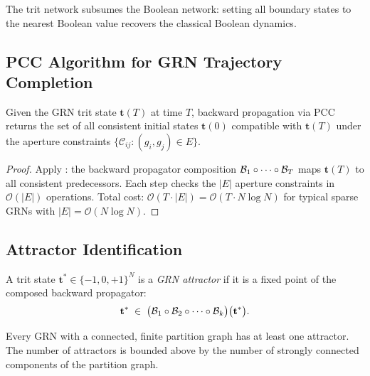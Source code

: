 The trit network subsumes the Boolean network: setting all boundary states
to the nearest Boolean value recovers the classical Boolean dynamics.

\subsection{PCC Algorithm for GRN Trajectory Completion}

\begin{theorem}
\label{thm:ch05-grn-back}
Given the GRN trit state $\mathbf{t}(T)$ at time $T$, backward propagation
via PCC returns the set of all consistent initial states $\mathbf{t}(0)$
compatible with $\mathbf{t}(T)$ under the aperture constraints $\{
\mathcal{C}_{ij} : (g_i, g_j) \in E\}$.
\end{theorem}

\begin{proof}
Apply : the backward propagator composition
$\mathcal{B}_1 \circ \cdots \circ \mathcal{B}_T$ maps $\mathbf{t}(T)$ to all
consistent predecessors.  Each step checks the $|E|$ aperture constraints
in $\mathcal{O}(|E|)$ operations.  Total cost: $\mathcal{O}(T \cdot |E|)
= \mathcal{O}(T \cdot N \log N)$ for typical sparse GRNs with
$|E| = \mathcal{O}(N \log N)$.
\end{proof}

\subsection{Attractor Identification}

\begin{definition}
\label{def:ch05-attractor}
A trit state $\mathbf{t}^* \in \{-1,0,+1\}^N$ is a \emph{GRN attractor}
if it is a fixed point of the composed backward propagator:
\begin{equation}
\label{eq:ch05-attractor}
    \mathbf{t}^* \;\in\; \bigl(\mathcal{B}_1 \circ \mathcal{B}_2 \circ \cdots \circ
    \mathcal{B}_k\bigr)\bigl(\mathbf{t}^*\bigr).
\end{equation}
\end{definition}

\begin{theorem}
\label{thm:ch05-attractor-exist}
Every GRN with a connected, finite partition graph has at least one
attractor.  The number of attractors is bounded above by the number of
strongly connected components of the partition graph.
\end{theorem}

